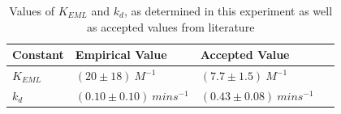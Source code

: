 \begin{table}[h]
    \begin{tabular}{| l | l | l |}
    \hline
    Constant & Empirical Value & Accepted Value \\ \hline
    $K_{EML}$ & $(20\pm{18}){\ }M^{-1}$ & $(7.7\pm{1.5}){\ }M^{-1}$ \ \ \cite{bib:easy_peasy_values} \\ \hline
    $k_{d}$ & $(0.10\pm{0.10}){\ }mins^{-1}$ & $(0.43\pm{0.08}){\ }mins^{-1}$ \ \ \cite{bib:easy_peasy_values} \\ 
    \hline
    \end{tabular}
    \caption[Table caption text]{Values of $K_{EML}$ and $k_d$, as determined in this experiment as well as accepted values from literature}
    \label{tbl:summary}
\end{table}
